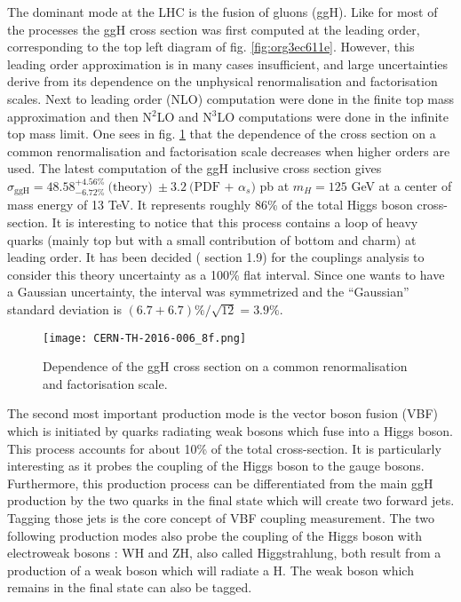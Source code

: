 \begin{enumerate}
The dominant mode at the LHC is the fusion of gluons (ggH).
Like for most of the processes the ggH cross section was first computed at the leading order, corresponding to the top left diagram of fig. \ref{fig:org3ec611e}.
However, this leading order approximation is in many cases insufficient, and large uncertainties derive from its dependence on the unphysical renormalisation and factorisation scales.
Next to leading order (NLO) computation were done in the finite top mass approximation \cite{Spira:1995rr} and then N$^2$LO and N$^3$LO computations were done \cite{CERN-PH-TH-2015-055,CERN-TH-2016-006} in the infinite top mass limit.
One sees in fig. \ref{CERN-TH-2016-006_8f} that the dependence of the cross section on a common renormalisation and factorisation scale decreases when higher orders are used.
The latest computation of the ggH inclusive cross section gives $\sigma_{\text{ggH}} = 48.58 ^{+4.56\%}_{-6.72\%}\ \text{(theory)}\ \pm 3.2\ \text{(PDF + }\alpha_s\text{)}$ pb at $m_H=125$ GeV at a center of mass energy of 13 TeV.
It represents roughly 86\% of the total Higgs boson cross-section.
It is interesting to notice that this process contains a loop of heavy quarks (mainly top but with a small contribution of bottom and charm) at leading order.
It has been decided (\cite{deFlorian:2227475} section 1.9) for the couplings analysis to consider this theory uncertainty as a 100\% flat interval.
Since one wants to have a Gaussian uncertainty, the interval was symmetrized and the ``Gaussian'' standard deviation is $(6.7+6.7)\% /\sqrt{12} = 3.9\%$.

\begin{figure}[h!]
  \centering
  \texttt{[image: CERN-TH-2016-006\_8f.png]}
  \caption{Dependence of the ggH cross section on a common renormalisation and factorisation scale. \cite{CERN-TH-2016-006}}
  \label{CERN-TH-2016-006_8f}
\end{figure}

The second most important production mode is the vector boson fusion (VBF) which is initiated by quarks radiating weak bosons which fuse into a Higgs boson.
This process accounts for about 10\% of the total cross-section.
It is particularly interesting as it probes the coupling of the Higgs boson to the gauge bosons.
Furthermore, this production process can be differentiated from the main ggH production by the two quarks in the final state which will create two forward jets.
Tagging those jets is the core concept of VBF coupling measurement.
The two following production modes also probe the coupling of the Higgs boson with electroweak bosons : WH and ZH, also called Higgstrahlung, both result from a production of a weak boson which will radiate a H.
The weak boson which remains in the final state can also be tagged.


\end{enumerate}
